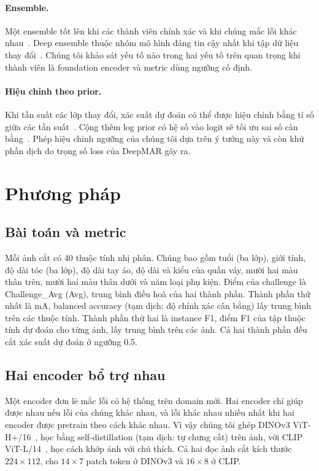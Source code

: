 \documentclass[10pt,twocolumn,letterpaper]{article}
\begin{document}
\paragraph{Ensemble.} Một ensemble tốt lên khi các thành viên chính xác và khi chúng mắc lỗi khác nhau~\cite{krogh}. Deep ensemble thuộc nhóm mô hình đáng tin cậy nhất khi tập dữ liệu thay đổi~\cite{deepens,ovadia}. Chúng tôi khảo sát yếu tố nào trong hai yếu tố trên quan trọng khi thành viên là foundation encoder và metric dùng ngưỡng cố định.

\paragraph{Hiệu chỉnh theo prior.} Khi tần suất các lớp thay đổi, xác suất dự đoán có thể được hiệu chỉnh bằng tỉ số giữa các tần suất~\cite{saerens,lipton}. Cộng thêm log prior có hệ số vào logit sẽ tối ưu sai số cân bằng~\cite{logitadj}. Phép hiệu chỉnh ngưỡng của chúng tôi dựa trên ý tưởng này và còn khử phần dịch do trọng số loss của DeepMAR gây ra.

\section{Phương pháp}
\label{sec:method}

\subsection{Bài toán và metric}
\label{sec:task}

Mỗi ảnh cắt có 40 thuộc tính nhị phân. Chúng bao gồm tuổi (ba lớp), giới tính, độ dài tóc (ba lớp), độ dài tay áo, độ dài và kiểu của quần váy, mười hai màu thân trên, mười hai màu thân dưới và năm loại phụ kiện. Điểm của challenge là Challenge\_Avg (Avg), trung bình điều hoà của hai thành phần. Thành phần thứ nhất là mA, balanced accuracy (tạm dịch: độ chính xác cân bằng) lấy trung bình trên các thuộc tính. Thành phần thứ hai là instance F1, điểm F1 của tập thuộc tính dự đoán cho từng ảnh, lấy trung bình trên các ảnh. Cả hai thành phần đều cắt xác suất dự đoán ở ngưỡng 0.5.

\subsection{Hai encoder bổ trợ nhau}
\label{sec:encoders}

Một encoder đơn lẻ mắc lỗi có hệ thống trên domain mới. Hai encoder chỉ giúp được nhau nếu lỗi của chúng khác nhau, và lỗi khác nhau nhiều nhất khi hai encoder được pretrain theo cách khác nhau. Vì vậy chúng tôi ghép DINOv3 ViT-H+/16~\cite{dinov3}, học bằng self-distillation (tạm dịch: tự chưng cất) trên ảnh, với CLIP ViT-L/14~\cite{clip}, học cách khớp ảnh với chú thích. Cả hai đọc ảnh cắt kích thước $224\times112$, cho $14\times7$ patch token ở DINOv3 và $16\times8$ ở CLIP.
\end{document}
